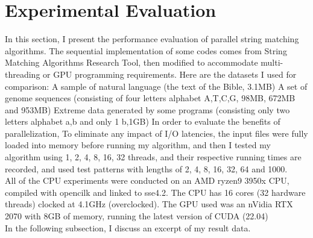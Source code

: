 \documentclass[11pt]{article}       %
\newcommand{\includeFig}[3]      {\begin{figure}[htb] \begin{center}
                                 \includegraphics
                                 [width=4in,keepaspectratio] %
                                 {#2}\caption{\label{#1}#3} \end{center} \end{figure}}
\begin{document}
\section{Experimental Evaluation} \label{expEval}

In this section, I present the performance evaluation of parallel string matching algorithms. The sequential implementation of some codes comes from String Matching Algorithms Research Tool, then modified to accommodate multi-threading or GPU programming requirements.
Here are the datasets I used for comparison:
A sample of natural language (the text of the Bible, 3.1MB) 
A set of genome sequences (consisting of four letters alphabet {A,T,C,G}, 98MB, 672MB and 953MB)
Extreme data generated by some programs (consisting only two letters alphabet {a,b} and only 1 b,1GB)
In order to evaluate the benefits of parallelization, To eliminate any impact of I/O latencies, the input files were fully loaded into memory before running my algorithm, and then I tested my algorithm using 1, 2, 4, 8, 16, 32 threads, and their respective running times are recorded, and used test patterns with lengths of 2, 4, 8, 16, 32, 64 and 1000.\\

 All of the CPU experiments were conducted on an AMD ryzen9 3950x CPU, compiled with opencilk and linked to sse4.2. The CPU has 16 cores (32 hardware threads) clocked at 4.1GHz (overclocked). The GPU used was an nVidia RTX 2070 with 8GB of memory, running the latest version of CUDA (22.04)\\
In the following subsection, I discuss an excerpt of my result data.\\

\end{document}
